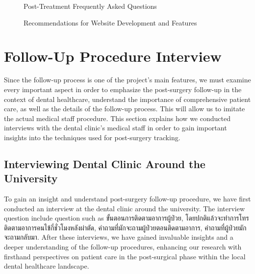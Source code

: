 \documentclass[12pt,oneside,openright,a4paper]{cpe-english-project}
\begin{document}
      \begin{figure}[!h]
        \centering
        \caption{Post-Treatment Frequently Asked Questions}\label{fig:Result_5}
      \end{figure}
      \begin{figure}[!h]
        \centering
        \caption{Recommendations for Website Development and Features}\label{fig:Result_6}
      \end{figure}
      \FloatBarrier

  \section{Follow-Up Procedure Interview}
    \qquad Since the follow-up process is one of the project's main features, we must examine every important aspect in order to emphasize the post-surgery follow-up in the context of dental healthcare, understand the importance of comprehensive patient care, as well as the details of the follow-up process. This will allow us to imitate the actual medical staff procedure. This section explains how we conducted interviews with the dental clinic's medical staff in order to gain important insights into the techniques used for post-surgery tracking. \par
    \subsection{Interviewing Dental Clinic Around the University}
      \qquad To gain an insight and understand post-surgery follow-up procedure, we have first conducted an interview at the dental clinic around the university. The interview question include question such as \textthai{ขั้นตอนการติดตามอาการผู้ป่วย, โดยปกติแล้วจะทำการโทรติดตามอาการคนไข้กี่ชั่วโมงหลังผ่าตัด, คำถามที่มักจะถามผู้ป่วยตอนติดตามอาการ, คำถามที่ผู้ป่วยมักจะถามกลับมา.} After these interviews, we have gained invaluable insights and a deeper understanding of the follow-up procedures, enhancing our research with firsthand perspectives on patient care in the post-surgical phase within the local dental healthcare landscape. \par
\end{document}
